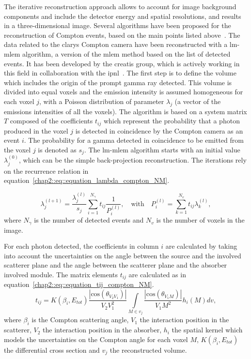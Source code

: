 The iterative reconstruction approach allows to account for image background components and include the detector energy and spatial resolutions, and results in a three-dimensional image. Several algorithms have been proposed for the reconstruction of Compton events, based on the main points listed above~\parencite{Schone2010, Zoglauer2011, Gillam2011, Andreyev2011, Mackin2012, Huang2018, Taya2017, Schone2017}. The data related to the \gls{clarys} Compton camera have been reconstructed with a \gls{lm-mlem} algorithm, a version of the \gls{mlem} method based on the list of detected events. It has been developed by the \gls{creatis} group, which is actively working in this field in collaboration with the \gls{ipnl}~\parencite{Maxim2009, Lojacono2013, Hilaire2014}.
The first step is to define the volume which includes the origin of the prompt gamma ray detected. This volume is divided into equal voxels and the emission intensity is assumed homogeneous for each voxel $j$, with a Poisson distribution of parameter $\lambda_j$ (a vector of the emissions intensities of all the voxels). The algorithm is based on a system matrix $T$ composed of the coefficients $t_{ij}$ which represent the probability that a photon produced in the voxel $j$ is detected in coincidence by the Compton camera as an event $i$. The probability for a gamma detected in coincidence to be emitted from the voxel $j$ is denoted as $s_j$.
The \gls{lm-mlem} algorithm starts with an initial value $\lambda^{(0)}_j$, which can be the simple back-projection reconstruction.
The iterations rely on the recurrence relation in equation~\ref{chap2::eq::equation_lambda_compton_NM}.

\begin{equation}
\lambda_j^{(l+1)} =  \frac{\lambda_j^{(l)} }{s_j} \sum\limits_{i=1}^{N_{\gamma}} t_{ij} \frac{1}{P_i^{(l)}},\quad \mathrm{with}\quad  P_i^{(l)}=\sum\limits_{k=1}^{N_{v}} t_{ij}\lambda_k^{(l)},
 \label{chap2::eq::equation_lambda_compton_NM}
\end{equation}
where $N_{\gamma}$ is the number of detected events and $N_v$ is the number of voxels in the image.

For each photon detected, the coefficients in column $i$ are calculated by taking into account the uncertainties on the angle between the source and the involved scatterer plane and the angle between the scatterer plane and the absorber involved module.
The matrix elements $t_{ij}$ are calculated as in equation~\ref{chap2::eq::equation_tij_compton_NM}.
\begin{equation}
 t_{ij} = K(\beta_i,E_{tot})\frac{|\mathrm{cos}(\theta_{{V_2V_1}}) |}{V_2V_1^2} \int\limits_{M\in v_j} \frac{|\mathrm{cos}(\theta_{V_1M})|}{V_1M^2} h_i(M)dv,
 \label{chap2::eq::equation_tij_compton_NM}
\end{equation}
where $\beta_i$ is the Compton scattering angle, $V_1$ the interaction position in the scatterer, $V_2$ the interaction position in the absorber, $h_i$ the spatial kernel which models the uncertainties on the Compton angle for each voxel $M$, $K(\beta_i,E_{tot})$ the differential cross section and $v_j$ the reconstructed volume.


